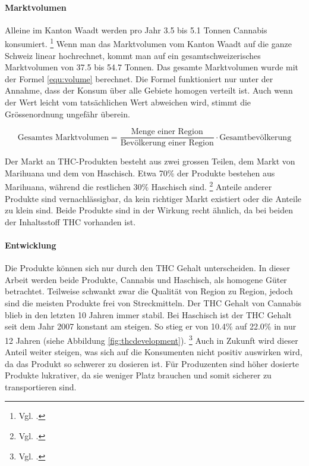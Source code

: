 \documentclass[../main.tex]{subfiles}
\begin{document}
	\paragraph{Marktvolumen}
	Alleine im Kanton Waadt werden pro Jahr 3.5 bis 5.1 Tonnen Cannabis konsumiert.%
	\footnote{Vgl. \cite[12]{zobel}.} 	
	Wenn man das Marktvolumen vom Kanton Waadt auf die ganze Schweiz linear hochrechnet, kommt man auf ein gesamtschweizerisches Marktvolumen von 37.5 bis 54.7 Tonnen.
	Das gesamte Marktvolumen wurde mit der Formel \ref{equ:volume} berechnet.
	Die Formel funktioniert nur unter der Annahme, dass der Konsum über alle Gebiete homogen verteilt ist.
	Auch wenn der Wert leicht vom tatsächlichen Wert abweichen wird, stimmt die Grössenordnung ungefähr überein.
	
	\vspace{7pt}
	\begin{equation}
		\text{Gesamtes Marktvolumen} = \frac{\text{Menge einer Region}}{\text{Bevölkerung einer Region}} \cdot \text{Gesamtbevölkerung}\label{equ:volume}
	\end{equation}
	\vspace{7pt}
	
	\noindent
	Der Markt an THC-Produkten besteht aus zwei grossen Teilen, dem Markt von Marihuana und dem von Haschisch.
	Etwa 70\% der Produkte bestehen aus Marihuana, während die restlichen 30\% Haschisch sind.%
	\footnote{Vgl. \cite[12]{zobel}.}
	Anteile anderer Produkte sind vernachlässigbar, da kein richtiger Markt existiert oder die Anteile zu klein sind.
	Beide Produkte sind in der Wirkung recht ähnlich, da bei beiden der Inhaltsstoff THC vorhanden ist.
	
	\paragraph{Entwicklung}
	Die Produkte können sich nur durch den THC Gehalt unterscheiden.
	In dieser Arbeit werden beide Produkte, Cannabis und Haschisch, als homogene Güter betrachtet.
	Teilweise schwankt zwar die Qualität von Region zu Region, jedoch sind die meisten Produkte frei von Streckmitteln.
	Der THC Gehalt von Cannabis blieb in den letzten 10 Jahren immer stabil.
	Bei Haschisch ist der THC Gehalt seit dem Jahr 2007 konstant am steigen.
	So stieg er von 10.4\% auf 22.0\% in nur 12 Jahren (siehe Abbildung \ref{fig:thcdevelopment}).%
	\footnote{Vgl. \cite[15]{sgrm}.}
	Auch in Zukunft wird dieser Anteil weiter steigen, was sich auf die Konsumenten nicht positiv auswirken wird, da das Produkt so schwerer zu dosieren ist.
	Für Produzenten sind höher dosierte Produkte lukrativer, da sie weniger Platz brauchen und somit sicherer zu transportieren sind.
	
\end{document}
